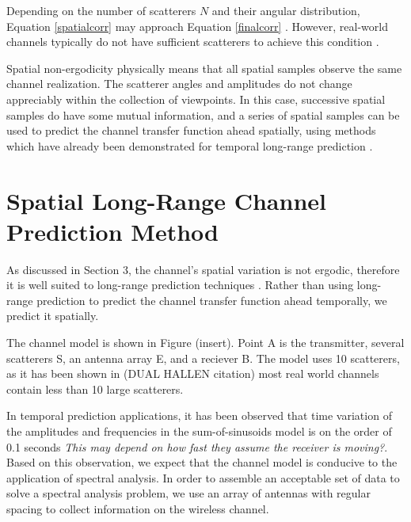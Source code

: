 \documentclass[11pt]{article} %
\begin{document}
Depending on the number of scatterers $N$ and their angular distribution, Equation \ref{spatialcorr} may approach Equation \ref{finalcorr} \cite{isukapalli2006}.  However, real-world channels typically do not have sufficient scatterers to achieve this condition \cite{duel-hallen2000}.  

Spatial non-ergodicity physically means that all spatial samples observe the same channel realization.  The scatterer angles and amplitudes do not change appreciably within the collection of viewpoints.  In this case, successive spatial samples do have some mutual information, and a series of spatial samples can be used to predict the channel transfer function ahead spatially, using methods which have already been demonstrated for temporal long-range prediction \cite{duel-hallen2000}.

\section{Spatial Long-Range Channel Prediction Method}\label{prediction}
As discussed in Section 3, the channel's spatial variation is not ergodic, therefore it is well suited to long-range prediction techniques \cite{(someone, perhaps a duel-hallen paper, said this)}. Rather than using long-range prediction to predict the channel transfer function ahead temporally, we predict it spatially. 

The channel model is shown in Figure (insert). Point A is the transmitter, several scatterers S, an antenna array E, and a reciever B. The model uses 10 scatterers, as it has been shown in (DUAL HALLEN citation) most real world channels contain less than 10 large scatterers.  

 In temporal prediction applications, it has been observed that time variation of the amplitudes and frequencies in the sum-of-sinusoids model is on the order of 0.1 seconds \cite{duel-hallen2007} \emph{This may depend on how fast they assume the receiver is moving?}.  Based on this observation, we expect that the channel model is conducive to the application of spectral analysis. In order to assemble an acceptable set of data to solve a spectral analysis problem, we use an array of antennas with regular spacing to collect information on the wireless channel.
\end{document}
